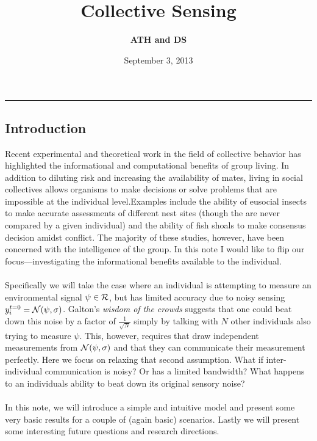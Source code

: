 \documentclass{article}
\title{Collective Sensing}
\author{\textbf{ATH and DS} \\}
\date{September 3, 2013}
\newcommand{\N}{{\cal N}}
\newcommand{\R}{{\cal R}}
\begin{document}
\maketitle

\captionsetup{labelfont=bf, font=footnotesize}

 


 

\vspace{10pt}

\hrule  %

\vspace{10pt}

 


\subsection*{Introduction}

Recent experimental and theoretical work in the field of collective behavior has highlighted the informational and computational benefits of group living.  In addition to diluting risk and increasing the availability of mates, living in social collectives allows organisms to make decisions or solve problems that are impossible at the individual level.\footnotemark  Examples include the ability of eusocial insects to make accurate assessments of different nest sites (though the are never compared by a given individual) and the ability of fish shoals to make consensus decision amidst conflict.  The majority of these studies, however, have been concerned with the intelligence of the group.  In this note I would like to flip our focus---investigating the informational benefits available to the individual. \\
\\
Specifically we will take the case where an individual is attempting to measure an environmental signal $\psi \in \R$, but has limited accuracy due to noisy sensing $y_{i}^{t=0} = \N(\psi,\sigma)$.  Galton's \emph{wisdom of the crowds} suggests that one could beat down this noise by a factor of $\frac{1}{\sqrt{N}}$ simply by talking with $N$ other individuals also trying to measure $\psi$.  This, however, requires that draw independent measurements from $\N(\psi,\sigma)$ and that they can communicate their measurement perfectly.  Here we focus on relaxing that second assumption.  What if inter-individual communication is noisy?   Or has a limited bandwidth?  What happens to an individuals ability to beat down its original sensory noise?    \\
\\
In this note, we will introduce a simple and intuitive model and present some very basic results for a couple of (again basic) scenarios.  Lastly we will present some interesting future questions and research directions. 
\end{document}
